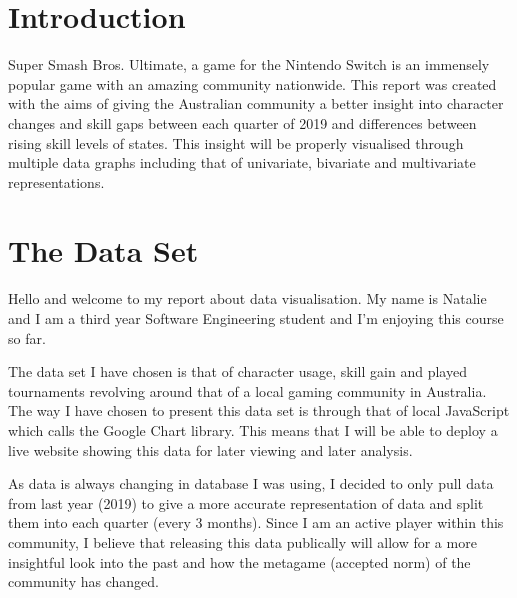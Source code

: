 \documentclass[11pt, oneside, a4paper]{article}
\begin{document}


\thispagestyle{empty}

\tableofcontents

\listoffigures

\newpage


\section{Introduction}
Super Smash Bros. Ultimate, a game for the Nintendo Switch is an immensely popular game with an amazing community nationwide. This report was created with the aims of giving the Australian community a better insight into character changes and skill gaps between each quarter of 2019 and differences between rising skill levels of states. This insight will be properly visualised through multiple data graphs including that of univariate, bivariate and multivariate representations.


\section{The Data Set}
Hello and welcome to my report about data visualisation. My name is Natalie and I am a third year Software Engineering student and I'm enjoying this course so far.
\

The data set I have chosen is that of character usage, skill gain and played tournaments revolving around that of a local gaming community in Australia. The way I have chosen to present this data set is through that of local JavaScript which calls the Google Chart library. This means that I will be able to deploy a live website showing this data for later viewing and later analysis. 
\

As data is always changing in database I was using, I decided to only pull data from last year (2019) to give a more accurate representation of data and split them into each quarter (every 3 months). Since I am an active player within this community, I believe that releasing this data publically will allow for a more insightful look into the past and how the metagame (accepted norm) of the community has changed.
\
\end{document}

